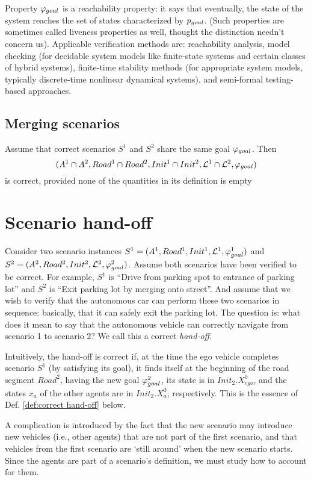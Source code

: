 Property $\varphi_{goal}$ is a reachability property: it says that eventually, the state of the system reaches the set of states characterized by $p_{goal}$.
(Such properties are sometimes called liveness properties as well, thought the distinction needn't concern us).
Applicable verification methods are: reachability analysis, model checking (for decidable system models like finite-state systems and certain classes of hybrid systems), finite-time stability methods (for appropriate system models, typically discrete-time nonlinear dynamical systems), and semi-formal testing-based approaches.

\subsection{Merging scenarios}
\label{sec:merging scenarios}
Assume that correct scenarios $S^1$ and $S^2$ share the same goal $\varphi_{goal}$.
Then 
\[(A^1 \cap A^2, Road^1 \cap Road^2, Init^1 \cap Init^2, \mathcal{L}^1 \cap \mathcal{L}^2, \varphi_{goal})\]
is correct, provided none of the quantities in its definition is empty

\section{Scenario hand-off}
\label{sec:scenarion hand-off}
Consider two scenario instances $S^1 = (A^1, Road^1, Init^1, \mathcal{L}^1, \varphi_{goal}^1)$
and
$S^2 = (A^2,Road^2, Init^2, \mathcal{L}^2, \varphi_{goal}^2)$.
Assume both scenarios have been verified to be correct.
For example, $S^1$ is ``Drive from parking spot to entrance of parking lot'' and $S^2$ is ``Exit parking lot by merging onto street''.
And assume that we wish to verify that the autonomous car can perform these two scenarios in sequence: basically, that it can safely exit the parking lot.
The question is: what does it mean to say that the autonomous vehicle can correctly navigate from scenario 1 to scenario 2?
We call this a correct \emph{hand-off}.

Intuitively, the hand-off is correct if, at the time the ego vehicle completes scenario $S^1$ (by satisfying its goal), it finds itself at the beginning of the road segment $Road^2$, having the new goal $\varphi_{goal}^2$, its state is in $Init_2.X_{ego}^0$, and the states $x_a$ of the other agents are in $Init_2.X_{a}^0$, respectively.
This is the essence of Def. \ref{def:correct hand-off} below.

A complication is introduced by the fact that the new scenario may introduce new vehicles (i.e., other agents) that are not part of the first scenario, and that vehicles from the first scenario are `still around' when the new scenario starts.
Since the agents are part of a scenario's definition, we must study how to account for them.

